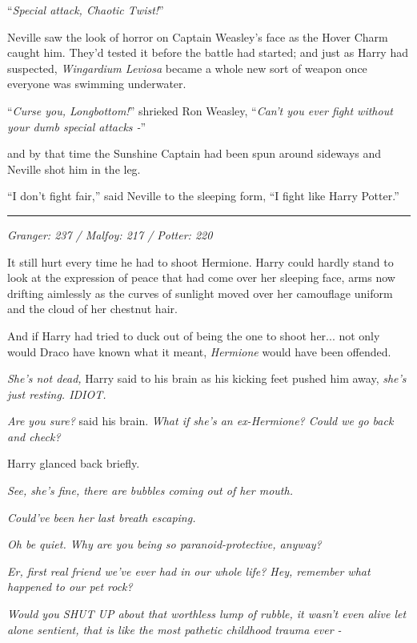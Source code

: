 ``\emph{Special attack, Chaotic Twist!}''

Neville saw the look of horror on Captain Weasley's face as the Hover Charm caught him. They'd tested it before the battle had started; and just as Harry had suspected, \emph{Wingardium Leviosa} became a whole new sort of weapon once everyone was swimming underwater.

``\emph{Curse you, Longbottom!}'' shrieked Ron Weasley, ``\emph{Can't you ever fight without your dumb special attacks -}''

and by that time the Sunshine Captain had been spun around sideways and Neville shot him in the leg.

``I don't fight fair,'' said Neville to the sleeping form, ``I fight like Harry Potter.''

\begin{center}\rule{3in}{0.4pt}\end{center}

\emph{Granger: 237 / Malfoy: 217 / Potter: 220}

It still hurt every time he had to shoot Hermione. Harry could hardly stand to look at the expression of peace that had come over her sleeping face, arms now drifting aimlessly as the curves of sunlight moved over her camouflage uniform and the cloud of her chestnut hair.

And if Harry had tried to duck out of being the one to shoot her... not only would Draco have known what it meant, \emph{Hermione} would have been offended.

\emph{She's not dead,} Harry said to his brain as his kicking feet pushed him away, \emph{she's just resting. IDIOT.}

\emph{Are you sure?} said his brain. \emph{What if she's an ex-Hermione? Could we go back and check?}

Harry glanced back briefly.

\emph{See, she's fine, there are bubbles coming out of her mouth.}

\emph{Could've been her last breath escaping.}

\emph{Oh be quiet. Why are you being so paranoid-protective, anyway?}

\emph{Er, first real friend we've ever had in our whole life? Hey, remember what happened to our pet rock?}

\emph{Would you SHUT UP about that worthless lump of rubble, it wasn't even alive let alone sentient, that is like the most pathetic childhood trauma ever -}

